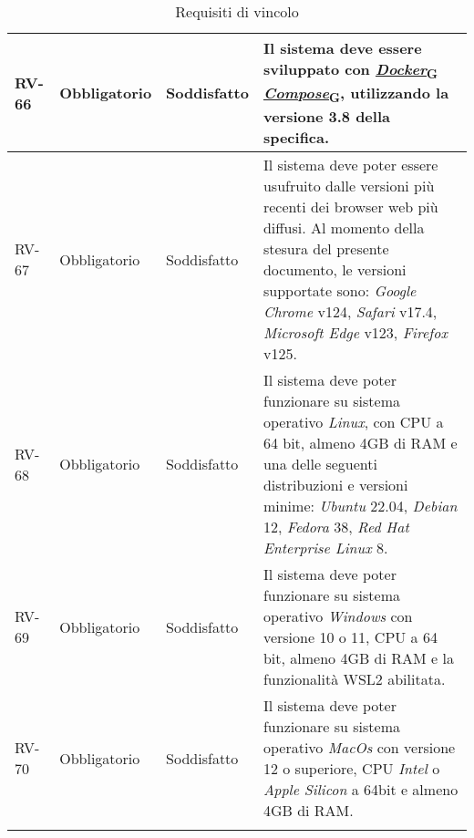 \begin{longtable}{|>{\centering\arraybackslash}m{}|>{\centering\arraybackslash}m{}|>{\centering\arraybackslash}m{}|>{\centering\arraybackslash}m{}|}
	RV-66           & Obbligatorio        & Soddisfatto                                                                                                           & Il sistema deve essere sviluppato con \href{https://7last.github.io/docs/pb/documentazione-interna/glossario\#docker-compose}{\href{https://7last.github.io/docs/pb/documentazione-interna/glossario\#docker}{\textit{Docker}\textsubscript{G}}\textit{ Compose}\textsubscript{G}}, utilizzando la versione 3.8 della specifica.
	\\\hline
	RV-67           & Obbligatorio        & Soddisfatto & Il sistema deve poter essere usufruito dalle versioni più recenti dei browser web più diffusi. Al momento della stesura del presente documento, le versioni supportate sono: \textit{Google Chrome} v124, \textit{Safari} v17.4, \textit{Microsoft Edge} v123, \textit{Firefox} v125.
	\\\hline
	RV-68           & Obbligatorio        & Soddisfatto                                                                                                           & Il sistema deve poter funzionare su sistema operativo \textit{Linux}, con CPU a 64 bit, almeno 4GB di RAM e una delle seguenti distribuzioni e versioni minime: \textit{Ubuntu} 22.04, \textit{Debian} 12, \textit{Fedora} 38, \textit{Red Hat Enterprise Linux} 8.
	\\\hline
	RV-69           & Obbligatorio        & Soddisfatto                                                                                                           & Il sistema deve poter funzionare su sistema operativo \textit{Windows} con versione 10 o 11, CPU a 64 bit, almeno 4GB di RAM e la funzionalità WSL2 abilitata.
	\\\hline
	RV-70           & Obbligatorio        & Soddisfatto                                                                                                           & Il sistema deve poter funzionare su sistema operativo \textit{MacOs} con versione 12 o superiore, CPU \textit{Intel} o \textit{Apple Silicon} a 64bit e almeno 4GB di RAM.
	\\\hline
	\caption{Requisiti di vincolo}
\end{longtable}

